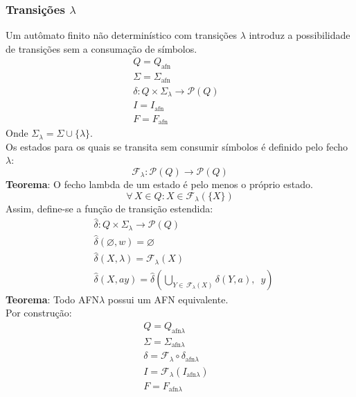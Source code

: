 \documentclass[11pt]{article}
\begin{document}
\subsubsection{Transições \(\lambda\)}
\label{sec:orged97219}
Um autômato finito não determinístico com transições \(\lambda\) introduz a
possibilidade de transições sem a consumação de símbolos.
\begin{align*}
  & Q = Q_{\text{afn}} && \\
  & \Sigma = \Sigma_{\text{afn}} && \\
  & \delta: Q \times \Sigma_{\lambda} \to \mathcal{P}(Q) && \\
  & I = I_{\text{afn}} && \\
  & F = F_{\text{afn}} &&
\end{align*}
Onde \(\Sigma_{\lambda} = \Sigma \cup \{\lambda\}\). \\[10pt]
Os estados para os quais se transita sem consumir símbolos é definido pelo fecho \(\lambda\):
\[
  \mathcal{F}_{\lambda}: \mathcal{P}(Q) \to \mathcal{P}(Q)
\]
\textbf{Teorema}: O fecho lambda de um estado é pelo menos o próprio estado.
\[
  \forall\, X \in Q: X \in \mathcal{F}_{\lambda}(\{X\})
\]
Assim, define-se a função de transição estendida:
\begin{align*}
  & \hat{\delta}: Q \times \Sigma_{\lambda} \to \mathcal{P}(Q) \\
  & \hat{\delta}(\varnothing, w) = \varnothing \\
  & \hat{\delta}(X, \lambda) = \mathcal{F}_{\lambda}(X) \\
  & \hat{\delta}(X, ay) = \hat{\delta} \left( \bigcup_{Y \in\, \mathcal{F}_{\lambda}(X)} \delta(Y, a),\enspace y \right)
\end{align*}
\textbf{Teorema}: Todo AFN\(\lambda\) possui um AFN equivalente. \\
Por construção:
\begin{align*}
  & Q = Q_{\text{afn}\lambda} && \\
  & \Sigma = \Sigma_{\text{afn}\lambda} && \\
  & \delta = \mathcal{F}_{\lambda} \circ \delta_{\text{afn}\lambda} && \\
  & I = \mathcal{F}_{\lambda}\left(I_{\text{afn}\lambda}\right) && \\
  & F = F_{\text{afn}\lambda} &&
\end{align*}
\end{document}
